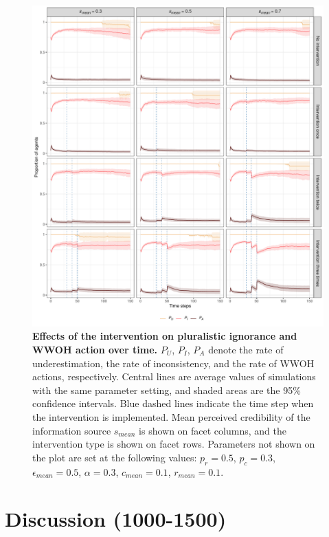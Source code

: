 \documentclass[
  11pt,
]{article}
\begin{document}
\begin{figure}[h]
  \centering
  \includegraphics[width=1\columnwidth]{./figures/intervention_process.pdf}
  \caption{\textbf{Effects of the intervention on pluralistic ignorance and WWOH action over time.} $P_U$, $P_I$, $P_A$ denote the rate of underestimation, the rate of inconsistency, and the rate of WWOH actions, respectively. Central lines are average values of simulations with the same parameter setting, and shaded areas are the 95\% confidence intervals. Blue dashed lines indicate the time step when the intervention is implemented. Mean perceived credibility of the information source $s_{mean}$ is shown on facet columns, and the intervention type is shown on facet rows. Parameters not shown on the plot are set at the following values: $p_r = 0.5$, $p_c = 0.3$, $\epsilon_{mean} = 0.5$, $\alpha = 0.3$, $c_{mean} = 0.1$, $r_{mean} = 0.1$.}
  \label{fig:5}
\end{figure}

\hypertarget{discussion-1000-1500}{%
\section{Discussion (1000-1500)}\label{discussion-1000-1500}}
\end{document}
